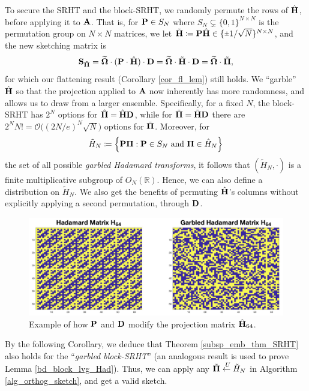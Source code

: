 \documentclass[journal,letterpaper,onecolumn,twoside,nofonttune]{IEEEtran}
\newcommand{\ow}{\mathcal{O}}
\newcommand{\Pibold}{\bold{\Pi}}
\newcommand{\Pibh}{\hat{\Pibold}}
\newcommand{\Pibt}{\tilde{\Pibold}}
\newcommand{\Omb}{\bold{\Omega}}
\newcommand{\Ombwt}{\widetilde{\Omb}}
\newcommand{\R}{\mathbb{R}}
\newcommand{\Pb}{\bold{P}}
\newcommand{\Sb}{\bold{S}}
\newcommand{\SbPt}{\Sb_{\Pibt}}
\newcommand{\Ab}{\bold{A}}
\newcommand{\Db}{\bold{D}}
\newcommand{\Ib}{\bold{I}}
\newcommand{\Hbh}{\hat{\bold{H}}}
\newcommand{\Hbt}{\tilde{\bold{H}}}
\newcommand{\Ht}{\tilde{H}}
\newcommand{\rpm}{\raisebox{.2ex}{$\scriptstyle\pm$}}
\newcommand{\getsU}{\overset{\ U}{\gets}}
\begin{document}
To secure the SRHT and the block-SRHT, we randomly permute the rows of $\Hbh$, before applying it to $\Ab$. That is, for $\Pb\in S_N$ where $S_N\subsetneq\{0,1\}^{N\times N}$ is the permutation group on $N\times N$ matrices, we let $\Hbt\coloneqq\Pb\Hbh\in\{\rpm1/\sqrt{N}\}^{N\times N}$, and the new sketching matrix is
\begin{equation}
\label{Sbt_proj}  %
  \SbPt = \Ombwt\cdot(\Pb\cdot\Hbh)\cdot\Db =  \Ombwt\cdot\Hbt\cdot\Db = \Ombwt\cdot\Pibt,
\end{equation}
for which our flattening result (Corollary \ref{cor_fl_lem}) still holds. We ``garble'' $\Hbh$ so that the projection applied to $\Ab$ now inherently has more randomness, and allows us to draw from a larger ensemble. Specifically, for a fixed $N$, the block-SRHT has $2^N$ options for $\Pibh=\Hbh\Db$, while for $\Pibt=\Hbt\Db$ there are $2^NN!=\ow\big((2N/e)^N\sqrt{N}\big)$ options for $\Pibt$. Moreover, for
\begin{equation}
\label{set_G_Had}  %
  \Ht_N\coloneqq\left\{\Pb\Pibold : \Pb\in S_N \text{ and } \Pibold\in \hat{H}_N\right\}
\end{equation}
the set of all possible \textit{garbled Hadamard transforms}, it follows that $(\Ht_N,\cdot)$ is a finite multiplicative subgroup of $O_N(\R)$. Hence, we can also define a distribution on $\Ht_N$. We also get the benefits of permuting $\Hbh$'s columns without explicitly applying a second permutation, through $\Db$.%

\begin{figure}[h]
  \centering
    \includegraphics[scale=.28]{Hadamard_transforms.png}
\caption{Example of how $\Pb$ and $\Db$ modify the projection matrix $\Hbh_{64}$.}
  \label{had_transforms_fig}
\end{figure}

By the following Corollary, we deduce that Theorem \ref{subsp_emb_thm_SRHT} also holds for the ``\textit{garbled block-SRHT}'' (an analogous result is used to prove Lemma \ref{bd_block_lvg_Had}). Thus, we can apply any $\Pibt\getsU\Ht_N$ in Algorithm \ref{alg_orthog_sketch}, and get a valid sketch.
\end{document}
